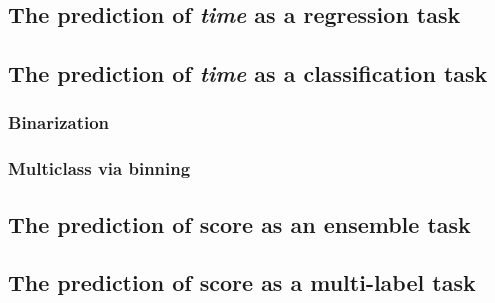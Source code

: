 \subsection{The prediction of \textit{time} as a regression task}
\subsection{The prediction of \textit{time} as a classification task}
\subsubsection{Binarization}
\subsubsection{Multiclass via binning}
\subsection{The prediction of score as an ensemble task}
\subsection{The prediction of score as a multi-label task} 


